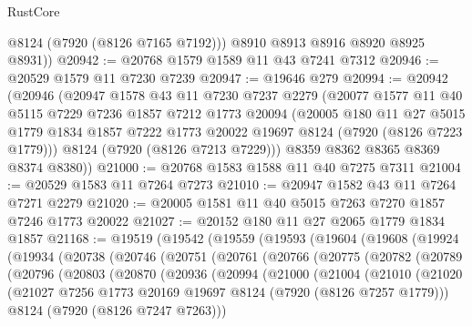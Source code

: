 \begin{lexlean}{RustCore}
\begin{coremodule}
          @8124
          (@7920 (@8126 @7165 @7192)))
        @8910
        @8913
        @8916
        @8920
        @8925
        @8931))
@20942 := @20768 @1579 @1589 @11 @43 @7241 @7312
@20946 := @20529 @1579 @11 @7230 @7239
@20947 := @19646 @279
@20994 := @20942
    (@20946
      (@20947
        @1578
        @43
        @11
        @7230
        @7237
        @2279
        (@20077
          @1577
          @11
          @40
          @5115
          @7229
          @7236
          @1857
          @7212
          @1773
          @20094
          (@20005
            @180
            @11
            @27
            @5015
            @1779
            @1834
            @1857
            @7222
            @1773
            @20022
            @19697
            @8124
            (@7920 (@8126 @7223 @1779)))
          @8124
          (@7920 (@8126 @7213 @7229)))
        @8359
        @8362
        @8365
        @8369
        @8374
        @8380))
@21000 := @20768 @1583 @1588 @11 @40 @7275 @7311
@21004 := @20529 @1583 @11 @7264 @7273
@21010 := @20947 @1582 @43 @11 @7264 @7271 @2279
@21020 := @20005 @1581 @11 @40 @5015 @7263 @7270 @1857 @7246 @1773 @20022
@21027 := @20152 @180 @11 @27 @2065 @1779 @1834 @1857
@21168 := @19519
    (@19542
      (@19559
        (@19593
          (@19604
            (@19608
              (@19924
                (@19934
                  (@20738
                    (@20746
                      (@20751
                        (@20761
                          (@20766
                            (@20775
                              (@20782
                                (@20789
                                  (@20796
                                    (@20803
                                      (@20870
                                        (@20936
                                          (@20994
                                            (@21000
                                              (@21004
                                                (@21010
                                                  (@21020
                                                    (@21027
                                                      @7256
                                                      @1773
                                                      @20169
                                                      @19697
                                                      @8124
                                                      (@7920 (@8126 @7257 @1779)))
                                                    @8124
                                                    (@7920 (@8126 @7247 @7263)))

\end{coremodule}
\end{lexlean}
